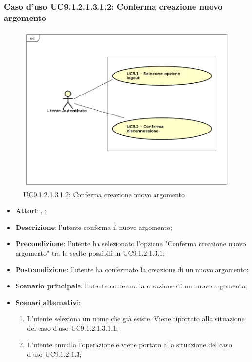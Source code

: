 							\subsubsection{Caso d'uso UC9.1.2.1.3.1.2: Conferma creazione nuovo argomento}
							\label{UC9.1.2.1.3.1.2}
							\begin{figure}[h]
								\centering
								\includegraphics[scale=0.5,keepaspectratio]{UML/UC9.png}
								\caption{UC9.1.2.1.3.1.2: Conferma creazione nuovo argomento}
							\end{figure}
							\FloatBarrier
							\begin{itemize}
								\item \textbf{Attori}: \uau, \uaupro;
								\item \textbf{Descrizione}: l'utente conferma il nuovo argomento;
								\item \textbf{Precondizione}: l'utente ha selezionato l'opzione "Conferma creazione nuovo argomento" tra le scelte possibili in UC9.1.2.1.3.1;
								\item \textbf{Postcondizione}: l'utente ha confermato la creazione di un nuovo argomento;
								\item \textbf{Scenario principale}: l'utente conferma la creazione di un nuovo argomento;
								\item \textbf{Scenari alternativi}: 
									\begin{enumerate}
										\item L'utente seleziona un nome che già esiste. Viene riportato alla situazione del caso d'uso UC9.1.2.1.3.1.1;
										\item L'utente annulla l'operazione e viene portato alla situazione del caso d'uso UC9.1.2.1.3;
									\end{enumerate}
						
							\end{itemize}
						
